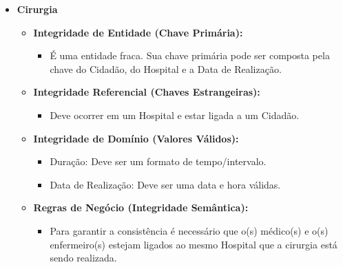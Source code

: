 \documentclass[12pt, a4paper]{article}
\begin{document}
\begin{itemize}
    \item \textbf{Cirurgia}
    \begin{itemize}
        \item \textbf{Integridade de Entidade (Chave Primária):}
        \begin{itemize}
            \item É uma entidade fraca. Sua chave primária pode ser composta pela chave do Cidadão, do Hospital e a Data de Realização.
        \end{itemize}
        \item \textbf{Integridade Referencial (Chaves Estrangeiras):}
        \begin{itemize}
            \item Deve ocorrer em um Hospital e estar ligada a um Cidadão.
        \end{itemize}
        \item \textbf{Integridade de Domínio (Valores Válidos):}
        \begin{itemize}
            \item Duração: Deve ser um formato de tempo/intervalo.
            \item Data de Realização: Deve ser uma data e hora válidas.
        \end{itemize}
        \item \textbf{Regras de Negócio (Integridade Semântica):}
        \begin{itemize}
            \item Para garantir a consistência é necessário que o(s) médico(s) e o(s) enfermeiro(s) estejam ligados ao mesmo Hospital que a cirurgia está sendo realizada.
        \end{itemize}
    \end{itemize}


\end{itemize}
\end{document}
